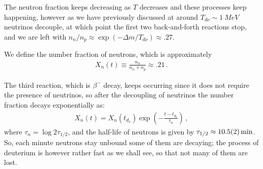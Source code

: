 \documentclass[main.tex]{subfiles}
\begin{document}
The neutron fraction keeps decreasing as \(T\) decreases and these processes keep happening, however as we have previously discussed at around \(T_{d \nu } \sim \SI{1}{MeV}\) neutrinos decouple, at which point the first two back-and-forth reactions stop, and we are left with \(n_n / n_p \approx \exp(- \Delta m / T_{d \nu }) \approx \num{.27}\). 

We define the number fraction of neutrons, which is approximately
%
\begin{align}
  X_n (t) \equiv \frac{n_n}{n_n+n_p} \approx \num{.21}
\,.
\end{align}

The third reaction, which is \(\beta^{-} \) decay, keeps occurring since it does not require the presence of neutrinos, so after the decoupling of neutrinos the number fraction decays exponentially as:
%
\begin{align}
  X_n(t) = X_n(t_{d_\nu }) \exp( - \frac{t - t_{d_\nu }}{\tau _n})
\,,
\end{align}
%
where \(\tau _n = \log 2 \tau_{1/2}\), and the half-life of neutrons is given by \(\tau_{1/2} \approx \SI{10.5+-0.2}{min}\).
So, each minute neutrons stay unbound some of them are decaying; the process of deuterium is however rather fast as we shall see, so that not many of them are lost.
\end{document}
